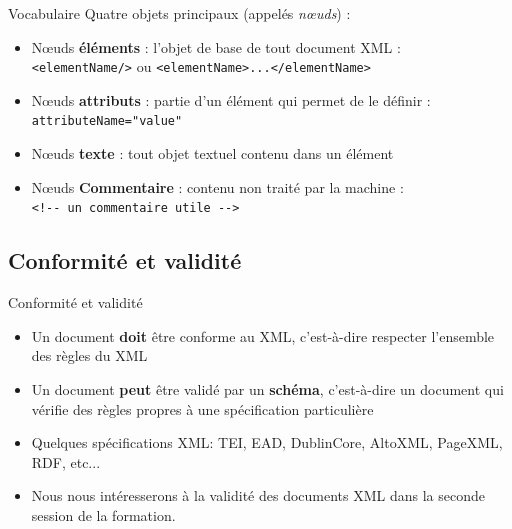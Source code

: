 \documentclass[11pt,aspectratio=1610]{beamer}
\begin{document}
\begin{frame}{Vocabulaire}
Quatre objets principaux (appelés \textit{n\oe uds}) :
\begin{itemize}
\item N\oe uds \textbf{éléments} : l'objet de base de tout document XML : \\ \texttt{<elementName/>} ou \texttt{<elementName>...</elementName>}
\item N\oe uds \textbf{attributs} : partie d'un élément qui permet de le définir : \\ \texttt{attributeName="value"}
\item N\oe uds \textbf{texte} : tout objet textuel contenu dans un élément
\item N\oe uds \textbf{Commentaire} : contenu non traité par la machine : \\ \texttt{<!-{}- un commentaire utile -{}->}
\end{itemize}
\end{frame}

\subsection{Conformité et validité}
\begin{frame}{Conformité et validité}
\begin{itemize}
\item Un document \textbf{doit} être conforme au XML, c'est-à-dire respecter l'ensemble des règles du XML
\item Un document \textbf{peut} être validé par un \textbf{schéma}, c'est-à-dire un document qui vérifie des règles propres à une spécification particulière
\item Quelques spécifications XML: TEI, EAD, DublinCore, AltoXML, PageXML, RDF, etc...
\item Nous nous intéresserons à la validité des documents XML dans la seconde session de la formation.
\end{itemize}
\end{frame}
\end{document}
